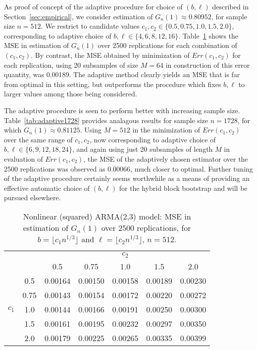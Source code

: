 \documentclass[a4paper, 12pt]{article}
\theoremstyle{plain}
\theoremstyle{definition}
\begin{document}
As proof of concept of the adaptive procedure for choice of $(b, \ell)$ described in Section~\ref{sec:empirical}, we consider estimation of $G_n(1) \approx 0.80952$, for sample size $n=512$. We restrict to candidate values $c_1, c_2 \in \{0.5, 0.75, 1.0, 1.5, 2.0\}$, corresponding to adaptive choice of $b, \ell \in \{4, 6, 8, 12, 16\}$. Table~\ref{tab:adaptive512} shows the MSE in estimation of $G_n(1)$ over 2500 replications for each combination of $(c_1, c_2)$. By contrast, the MSE obtained by minimization of $Err(c_1, c_2)$ for each replication, using 20 subsamples of size $M=64$ in construction of this error quantity, was 0.00189. The adaptive method clearly yields an MSE that is far from optimal in this setting, but outperforms the procedure which fixes $b, \ell$ to larger values among those being considered. 

The adaptive procedure is seen to perform better with increasing sample size. Table~\ref{tab:adaptive1728} provides analagous results for sample size $n=1728$, for which $G_n(1) \approx 0.81125$. Using $M=512$ in the minimization of $Err(c_1, c_2)$ over the same range of $c_1, c_2$, now corresponding to adaptive choice of $b, \ell \in \{6,9,12, 18,24\}$, and again using just 20 subsamples of length $M$ in evaluation of $Err(c_1, c_2)$, the MSE of the adaptively chosen estimator over the 2500 replications was observed as 0.00066, much closer to optimal. Further tuning of the adaptive procedure certainly seems worthwhile as a means of providing an effective automatic choice of $(b, \ell)$ for the hybrid block bootstrap and will be pursued elsewhere.

\begin{table}[h]
\caption{\label{tab:adaptive512}
Nonlinear (squared) ARMA(2,3) model: MSE in estimation of $G_n(1)$ over 2500 replications, for $b= \lfloor c_{1}n^{1/3} \rfloor $ and $\ell= \lfloor c_{2}n^{1/3} \rfloor $, $n=512$.}
\centering
\begin{tabular}{c c | c c c c c}
&&&&$c_2$&&\\ 
&&0.5&0.75&1.0&1.5&2.0 \\
\hline

&0.5&0.00164&0.00150&0.00158&0.00189&0.00230 \\
&0.75&0.00143&0.00154&0.00172&0.00220&0.00272\\
$c_1$&1.0&0.00144&0.00166&0.00191&0.00250& 0.00300\\
&1.5&0.00161&0.00195&0.00232&0.00297& 0.00350\\
&2.0&0.00179&0.00225&0.00265&0.00335& 0.00399\\
\hline

\end{tabular}
\end{table}
\end{document}
